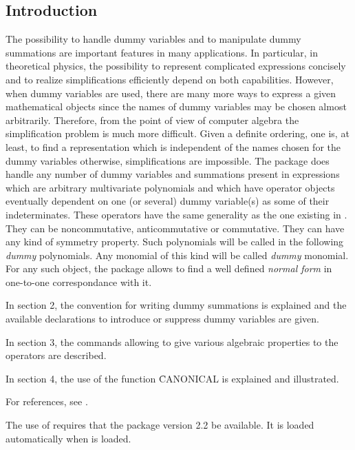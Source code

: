 

\subsection{Introduction}
The possibility to handle dummy variables and to manipulate  
dummy summations are important features in many applications. In particular, 
in theoretical physics, the possibility to represent complicated expressions
concisely and to realize simplifications efficiently depend 
on both capabilities.
However, when dummy variables are used, there are many more  ways 
to express a given mathematical objects since 
the names of dummy variables may be chosen  almost arbitrarily.
Therefore, from the point of view of computer algebra
the simplification problem is much more difficult. 
Given a definite ordering, one is, at least, to find a representation which 
is independent of the names chosen for the dummy variables otherwise, 
simplifications are impossible.  
The package does handle any number of dummy variables and summations 
present in expressions which are arbitrary multivariate polynomials  
and which  have operator objects eventually dependent on one (or several) 
dummy variable(s) as some of their indeterminates.
These operators have the same generality as the one existing in {\REDUCE}.  
They can be noncommutative, anticommutative or commutative. They can have 
any kind of symmetry property.
Such polynomials will be called in the following \emph{dummy} polynomials.
Any monomial of this kind will be called  \emph{dummy} monomial.
For any such object, the package allows to find a well defined 
\emph{normal form} in one-to-one correspondance with it.

In section 2, the convention for writing dummy summations is explained 
and the available declarations to introduce or suppress dummy variables
are given.

In section 3, the commands allowing to give 
various algebraic properties to the operators are described.

In section 4, the use of the function \f{CANONICAL} is 
explained and illustrated.

For references, see \cite{BUTLER1985363,ButlerCannon1982a,Butler1982a,Leon1980a,Leon1984a,Leon1991PermutationGA,Linton1991415,McKay1977a,RodinonovElAl1989a,Sims1971a,Sims1971b,Burnel1994a,Caprasse1997a}.

The use of  requires that the package  
 version 2.2 be available. It is loaded automatically when  is loaded.

